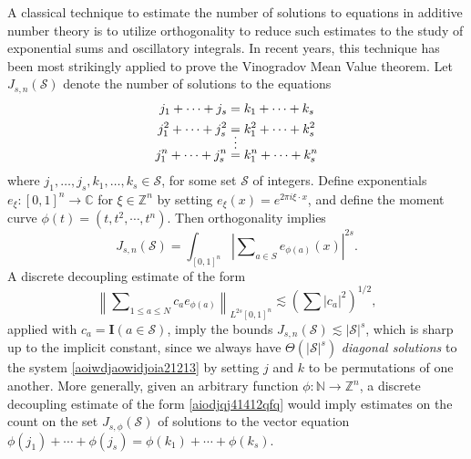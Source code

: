 \documentclass[12pt]{article}
\begin{document}
A classical technique to estimate the number of solutions to equations in additive number theory is to utilize orthogonality to reduce such estimates to the study of exponential sums and oscillatory integrals. In recent years, this technique has been most strikingly applied to prove the Vinogradov Mean Value theorem. Let $J_{s,n}(\mathcal{S})$ denote the number of solutions to the equations
%
\begin{equation} \label{aoiwdjaowidjoia21213}
\begin{split}
    j_1 + \cdots + j_s &= k_1 + \cdots + k_s\\
    j_1^2 + \cdots + j_s^2 &= k_1^2 + \cdots + k_s^2\\
    &\shortvdotswithin{=}
    j_1^n + \cdots + j_s^n &= k_1^n + \cdots + k_s^n
\end{split}
\end{equation}
where $j_1,\dots, j_s, k_1,\dots,k_s \in \mathcal{S}$, for some set $\mathcal{S}$ of integers. Define exponentials $e_\xi: [0,1]^n \to \mathbb{C}$ for $\xi \in \mathbb{Z}^n$ by setting $e_\xi(x) = e^{2 \pi i \xi \cdot x}$, and define the moment curve $\phi(t) = (t,t^2,\cdots,t^n)$. Then orthogonality implies
%
\begin{equation}
    J_{s,n}(\mathcal{S}) = \int_{[0,1]^n} \left| \sum\nolimits_{a \in S} e_{\phi(a)}(x) \right|^{2s}.
\end{equation}
%
A discrete decoupling estimate of the form
%
\begin{equation} \label{aiodjqj41412qfq}
    \left\| \sum\nolimits_{1 \leq a \leq N} c_a e_{\phi(a)} \right\|_{L^{2s}[0,1]^n} \lesssim \left( \sum |c_a|^2 \right)^{1/2},
\end{equation}
%
applied with $c_a = \mathbf{I}(a \in \mathcal{S})$, imply the bounds $J_{s,n}(\mathcal{S}) \lesssim |\mathcal{S}|^s$, which is sharp up to the implicit constant, since we always have $\Theta ( |\mathcal{S}|^s )$ \emph{diagonal solutions} to the system \eqref{aoiwdjaowidjoia21213} by setting $j$ and $k$ to be permutations of one another. More generally, given an arbitrary function $\phi: \mathbb{N} \to \mathbb{Z}^n$, a discrete decoupling estimate of the form \eqref{aiodjqj41412qfq} would imply estimates on the count on the set  $J_{s,\phi}(\mathcal{S})$ of solutions to the vector equation $\phi(j_1) + \cdots + \phi(j_s) = \phi(k_1) + \cdots + \phi(k_s)$.
\end{document}
